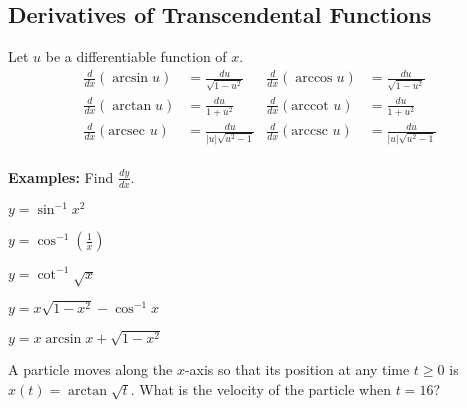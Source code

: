 \documentclass[addpoints, 12pt]{exam}
\begin{document}
\subsection*{Derivatives of Transcendental Functions}
\begin{tcolorbox}[title= DERIVATIVES OF INVERSE TRIGONOMETRIC FUNCTIONS,black,sharp corners, colback=white, colbacktitle=white, coltitle=black, boxrule=1pt]
    
    Let $u$ be a differentiable function of $x$.
    \begin{align*}
        \frac{d}{dx}(\arcsin u) &= \frac{du}{\sqrt{1-u^2}} & \frac{d}{dx}(\arccos u) &= \frac{du}{\sqrt{1-u^2}}\\
        \frac{d}{dx}(\arctan u) &= \frac{du}{1+u^2} & \frac{d}{dx}(\text{arccot } u) &= \frac{du}{1+u^2}\\
        \frac{d}{dx}(\text{arcsec } u) &= \frac{du}{|u|\sqrt{u^2-1}} & \frac{d}{dx}(\text{arccsc } u) &= \frac{du}{|u|\sqrt{u^2-1}}\\
    \end{align*}
\end{tcolorbox}
\vspace{.15cm}
\noindent\textbf{Examples:} Find $\displaystyle\frac{dy}{dx}$.
\begin{questions}
    \question $\displaystyle y=\sin^{-1}x^2$
    
    \question $\displaystyle y=\cos^{-1}\left(\frac{1}{x}\right)$
    
    \question $\displaystyle y=\cot^{-1}\sqrt{x}$
    
    \question $\displaystyle y=x\sqrt{1-x^2}-\cos^{-1}x$
    
    \newpage
    
    \question $\displaystyle y=x\arcsin x+\sqrt{1-x^2}$
    
    \question A particle moves along the $x$-axis so that its position at any time $t\ge0$ is $x(t)=\arctan\sqrt{t}$. What is the velocity of the particle when $t=16$?
\end{questions}
\end{document}
